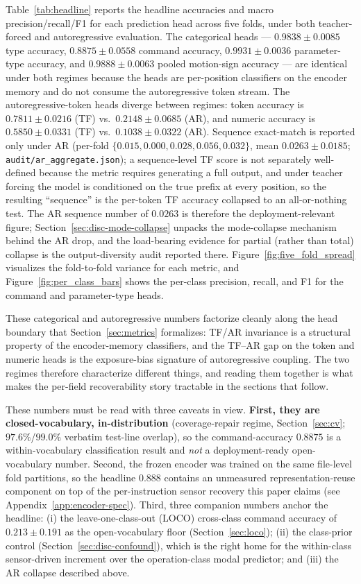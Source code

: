 \documentclass[sensors,article,submit,moreauthors,pdftex]{Definitions/mdpi}
\begin{document}
Table~\ref{tab:headline} reports the headline accuracies and macro precision/recall/F1 for each prediction head across five folds, under both teacher-forced and autoregressive evaluation. The categorical heads --- $0.9838 \pm 0.0085$ type accuracy, $0.8875 \pm 0.0558$ command accuracy, $0.9931 \pm 0.0036$ parameter-type accuracy, and $0.9888 \pm 0.0063$ pooled motion-sign accuracy --- are identical under both regimes because the heads are per-position classifiers on the encoder memory and do not consume the autoregressive token stream. The autoregressive-token heads diverge between regimes: token accuracy is $0.7811 \pm 0.0216$ (TF) vs.\ $0.2148 \pm 0.0685$ (AR), and numeric accuracy is $0.5850 \pm 0.0331$ (TF) vs.\ $0.1038 \pm 0.0322$ (AR). Sequence exact-match is reported only under AR (per-fold $\{0.015, 0.000, 0.028, 0.056, 0.032\}$, mean $0.0263 \pm 0.0185$; \texttt{audit/ar\_aggregate.json}); a sequence-level TF score is not separately well-defined because the metric requires generating a full output, and under teacher forcing the model is conditioned on the true prefix at every position, so the resulting ``sequence'' is the per-token TF accuracy collapsed to an all-or-nothing test. The AR sequence number of $0.0263$ is therefore the deployment-relevant figure; Section~\ref{sec:disc-mode-collapse} unpacks the mode-collapse mechanism behind the AR drop, and the load-bearing evidence for partial (rather than total) collapse is the output-diversity audit reported there. Figure~\ref{fig:five_fold_spread} visualizes the fold-to-fold variance for each metric, and Figure~\ref{fig:per_class_bars} shows the per-class precision, recall, and F1 for the command and parameter-type heads.

These categorical and autoregressive numbers factorize cleanly along the head boundary that Section~\ref{sec:metrics} formalizes: TF/AR invariance is a structural property of the encoder-memory classifiers, and the TF--AR gap on the token and numeric heads is the exposure-bias signature of autoregressive coupling. The two regimes therefore characterize different things, and reading them together is what makes the per-field recoverability story tractable in the sections that follow.

These numbers must be read with three caveats in view. \textbf{First, they are closed-vocabulary, in-distribution} (coverage-repair regime, Section~\ref{sec:cv}; $97.6\%$/$99.0\%$ verbatim test-line overlap), so the command-accuracy $0.8875$ is a within-vocabulary classification result and \emph{not} a deployment-ready open-vocabulary number. Second, the frozen encoder was trained on the same file-level fold partitions, so the headline $0.888$ contains an unmeasured representation-reuse component on top of the per-instruction sensor recovery this paper claims (see Appendix~\ref{app:encoder-spec}). Third, three companion numbers anchor the headline: (i) the leave-one-class-out (LOCO) cross-class command accuracy of $0.213 \pm 0.191$ as the open-vocabulary floor (Section~\ref{sec:loco}); (ii) the class-prior control (Section~\ref{sec:disc-confound}), which is the right home for the within-class sensor-driven increment over the operation-class modal predictor; and (iii) the AR collapse described above.
\end{document}
